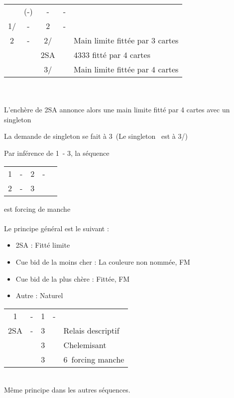 \documentclass[a4paper, oneside, 11pt]{report}
\begin{document}
		\begin{tabular}{cccc|l}
		& (-) & - & - &\\
		1\coeur/\pique & - & 2\trefle & - &\\
		2\carreau & - & 2\coeur/\pique && Main limite fittée par 3 cartes\\
		&& 2SA && 4333 fitté par 4 cartes\\
		&& 3\coeur/\pique && Main limite fittée par 4 cartes\\
		\end{tabular}\\\\
		
		L'enchère de 2SA annonce alors une main limite fitté par 4 cartes avec un singleton
		
		La demande de singleton se fait à 3\trefle\ (Le singleton \trefle\ est à 3\coeur/\pique)\\

	
		Par inférence de 1\pique\ - 3\coeur, la séquence 		
		\begin{tabular}{cccc|l}
		1\pique & - & 2\coeur & - &\\
		2\pique & - & 3\coeur && \\
		\end{tabular}
		est forcing de manche\\\\
		
		Le principe général est le suivant :
		\begin{itemize}
		\item 2SA : Fitté limite
		\item Cue bid de la moins cher : La couleure non nommée, FM
		\item Cue bid de la plus chère : Fittée, FM
		\item Autre : Naturel\\
		\end{itemize}

		\begin{tabular}{cccc|l}
		1\coeur & - & 1\pique & - &\\
		2SA & - & 3\trefle && Relais descriptif\\
		&& 3\coeur && Chelemisant\\
		&& 3\pique && 6\pique\ forcing manche\\
		\end{tabular}\\
		Même principe dans les autres séquences.\\
		
\end{document}
